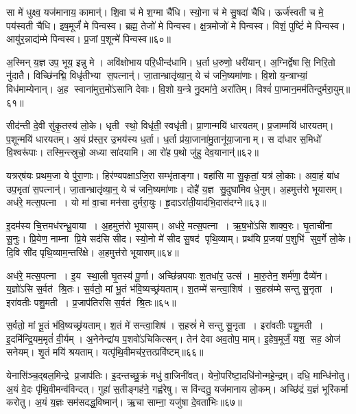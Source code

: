 सा मे॑ धुक्ष्व॒ यज॑मानाय॒ कामान्॑।
शि॒वा च॑ मे श॒ग्मा चै॑धि।
स्यो॒ना च॑ मे सु॒षदा॑ चैधि।
ऊर्ज॑स्वती च मे॒ पय॑स्वती चैधि।
इष॒मूर्जं॑ मे पिन्वस्व।
ब्रह्म॒ तेजो॑ मे पिन्वस्व।
क्ष॒त्रमोजो॑ मे पिन्वस्व।
विशं॒ पुष्टिं॑ मे पिन्वस्व।
आयु॑र॒न्नाद्य॑म्मे पिन्वस्व।
प्र॒जां प॒शून्मे॑ पिन्वस्व॥६०॥

अ॒स्मिन् य॒ज्ञ उप॒ भूय॒ इन्नु मे।
अवि॑क्षोभाय परि॒धीन्द॑धामि।
ध॒र्ता ध॒रुणो॒ धरी॑यान्।
अ॒ग्निर्द्वेषासि॒ निरि॒तो नु॑दातै।
विच्छि॑नद्मि॒ विधृ॑तीभ्या स॒पत्नान्॑।
जा॒तान्भ्रातृ॑व्या॒न्॒ ये च॑ जनि॒ष्यमा॑णाः।
वि॒शो य॒न्त्राभ्यां॒ विध॑माम्येनान्।
अ॒ह स्वाना॑मुत्त॒मो॑ऽसानि देवाः।
वि॒शो य॒न्त्रे नु॒दमा॑ने॒ अरा॑तिम्।
विश्वं॑ पा॒प्मान॒मम॑तिन्दुर्मरा॒युम्॥६१॥

सीद॑न्ती दे॒वी सु॑कृ॒तस्य॑ लो॒के।
धृती स्थो॒ विधृ॑ती॒ स्वधृ॑ती।
प्रा॒णान्मयि॑ धारयतम्।
प्र॒जाम्मयि॑ धारयतम्।
प॒शून्मयि॑ धारयतम्।
अ॒यं प्र॑स्त॒र उ॒भय॑स्य ध॒र्ता।
ध॒र्ता प्र॑या॒जाना॑मु॒तानू॑या॒जानाम्।
स दा॑धार स॒मिधो॑ वि॒श्वरू॑पाः।
तस्मि॒न्त्स्रुचो॒ अध्या सा॑दयामि।
आ रो॑ह प॒थो जु॑हु देव॒यानान्॑॥६२॥

यत्रर्‌ष॑यः प्रथम॒जा ये पु॑रा॒णाः।
हिर॑ण्यपक्षाऽजि॒रा सम्भृ॑ताङ्गा।
वहा॑सि मा सु॒कृतां॒ यत्र॑ लो॒काः।
अवा॒हं बा॑ध उप॒भृता॑ स॒पत्नान्॑।
जा॒तान्भ्रातृ॑व्या॒न्॒ ये च॑ जनि॒ष्यमा॑णाः।
दोहै॑ य॒ज्ञ सु॒दुघा॑मिव धे॒नुम्।
अ॒हमुत्त॑रो भूयासम्।
अध॑रे॒ मत्स॒पत्ना।
यो मा॑ वा॒चा मन॑सा दुर्मरा॒युः।
हृ॒दाऽरा॑ती॒याद॑भि॒दास॑दग्ने॥६३॥

इ॒दम॑स्य चि॒त्तमध॑रन्ध्रु॒वाया।
अ॒हमुत्त॑रो भूयासम्।
अध॑रे॒ मत्स॒पत्ना।
ऋ॒ष॒भो॑ऽसि शाक्व॒रः।
घृ॒ताची॑ना सू॒नुः।
प्रि॒येण॒ नाम्ना प्रि॒ये सद॑सि सीद।
स्यो॒नो मे॑ सीद सु॒षद॑ पृथि॒व्याम्।
प्रथ॑यि प्र॒जया॑ प॒शुभि॑ सुव॒र्गे लो॒के।
दि॒वि सी॑द पृथि॒व्याम॒न्तरि॑क्षे।
अ॒हमुत्त॑रो भूयासम्॥६४॥

अध॑रे॒ मत्स॒पत्ना।
इ॒य स्था॒ली घृ॒तस्य॑ पू॒र्णा।
अच्छि॑न्नपयाः श॒तधा॑र॒ उत्स॑।
मा॒रु॒तेन॒ शर्म॑णा॒ दैव्ये॑न।
य॒ज्ञो॑ऽसि स॒र्वत॑ श्रि॒तः।
स॒र्वतो॒ मां भू॒तं भ॑वि॒ष्यच्छ्र॑यताम्।
श॒तम्मे॑ सन्त्वा॒शिष॑।
स॒हस्र॑म्मे सन्तु सू॒नृता।
इरा॑वतीः पशु॒मती।
प्र॒जाप॑तिरसि स॒र्वत॑ श्रि॒तः॥६५॥

स॒र्वतो॒ मां भू॒तं भ॑वि॒ष्यच्छ्र॑यताम्।
श॒तं मे॑ सन्त्वा॒शिष॑।
स॒हस्रं॑ मे सन्तु सू॒नृता।
इरा॑वतीः पशु॒मती।
इ॒दमि॑न्द्रि॒यम॒मृतं॑ वी॒र्यम्।
अ॒नेनेन्द्रा॑य प॒शवो॑ऽचिकित्सन्।
तेन॑ देवा अव॒तोप॒ माम्।
इ॒हेष॒मूर्जं॒ यश॒ सह॒ ओज॑ सनेयम्।
शृ॒तं मयि॑ श्रयताम्।
यत्पृ॑थि॒वीमच॑र॒त्तत्प्रवि॑ष्टम्॥६६॥

येनासि॑ञ्च॒द्बल॒मिन्द्रे प्र॒जाप॑तिः।
इ॒दन्तच्छु॒क्रं मधु॑ वा॒जिनी॑वत्।
येनो॒परि॑ष्टा॒दधि॑नोन्महे॒न्द्रम्।
दधि॒ मान्धि॑नोतु।
अ॒यं वे॒दः पृ॑थि॒वीमन्व॑विन्दत्।
गुहा॑ स॒तीङ्गह॑ने॒ गह्व॑रेषु।
स वि॑न्दतु॒ यज॑मानाय लो॒कम्।
अच्छि॑द्रं य॒ज्ञं भूरि॑कर्मा करोतु।
अ॒यं य॒ज्ञः सम॑सदद्ध॒विष्मान्॑।
ऋ॒चा साम्ना॒ यजु॑षा दे॒वता॑भिः॥६७॥

